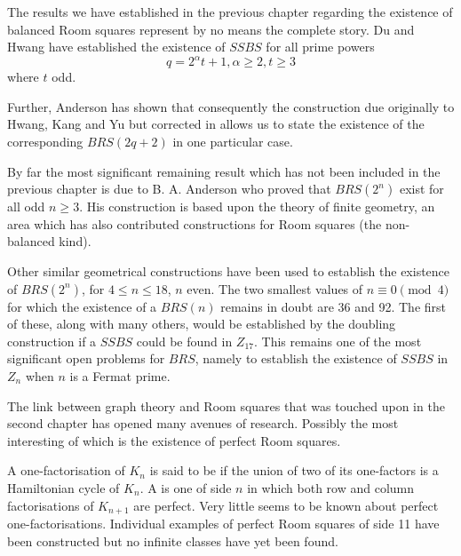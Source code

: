 The results we have established in the previous chapter regarding the existence of balanced Room squares represent by no means the complete story.
Du and Hwang
\cite{duExistenceSymmetricSkew1988}
have established the existence of $SSBS$ for all prime powers
\begin{equation}
q = 2^{\alpha}t + 1, \alpha \geq 2, t \geq 3
\end{equation}
where $t$ odd.

Further, Anderson has shown that consequently the construction due originally to Hwang, Kang and Yu
\cite{hwangCompleteBalancedHowell1984}
but corrected in
\cite{andersonConstructionBalancedRoom1999}
allows us to state the existence of the corresponding $BRS(2q + 2)$ in one particular case.

By far the most significant remaining result which has not been included in the previous chapter is due to B. A. Anderson who proved that $BRS(2^n)$ exist for all odd $n \geq 3$.
His construction is based upon the theory of finite geometry, an area which has also contributed constructions for Room squares (the non-balanced kind).

Other similar geometrical constructions have been used to establish the existence of $BRS(2^n)$, for $4 \leq n \leq 18$, $n$ even.
The two smallest values of $n \equiv 0 \pmod 4$ for which the existence of a $BRS(n)$ remains in doubt are 36 and 92.
The first of these, along with many others, would be established by the doubling construction if a $SSBS$ could be found in $Z_{17}$.
This remains one of the most significant open problems for $BRS$, namely to establish the existence of $SSBS$ in $Z_n$ when $n$ is a Fermat prime.

The link between graph theory and Room squares that was touched upon in the second chapter has opened many avenues of research.
Possibly the most interesting of which is the existence of perfect Room squares.

A one-factorisation of $K_n$ is said to be  if the union of two of its one-factors is a Hamiltonian cycle of $K_n$.
A  is one of side $n$ in which both row and column factorisations of $K_{n + 1}$ are perfect.
Very little seems to be known about perfect one-factorisations.
Individual examples of perfect Room squares of side 11 have been constructed but no infinite classes have yet been found.
